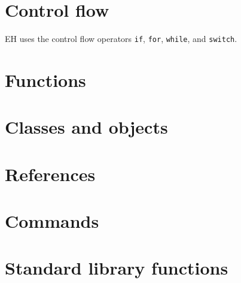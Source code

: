 \documentclass{article}
\begin{document}
\section{Control flow}
EH uses the control flow operators \verb#if#, \verb#for#, \verb#while#, and \verb#switch#. 
\section{Functions}

\section{Classes and objects}

\section{References}

\section{Commands}

\section{Standard library functions}
\end{document}
